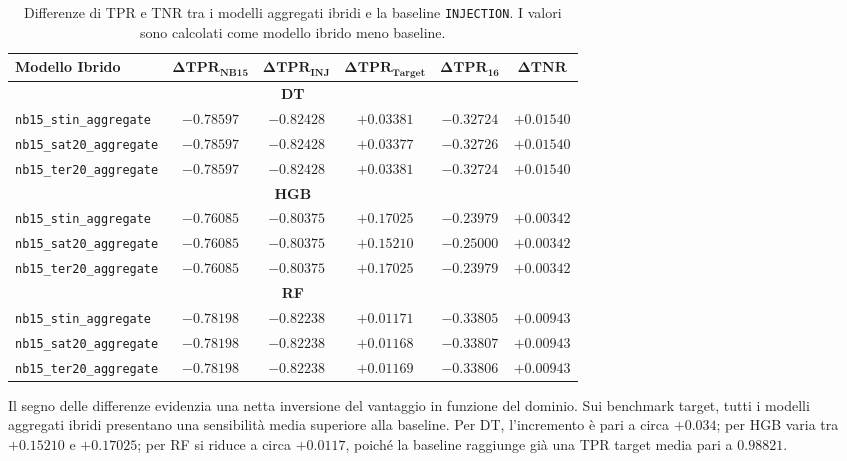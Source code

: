 \begin{table}[H]
    \centering
    \small
    \caption{Differenze di TPR e TNR tra i modelli aggregati ibridi e la baseline \texttt{INJECTION}. I valori sono calcolati come modello ibrido meno baseline.}
    \label{tab:hybrid_vs_base_aggregate_delta}
    \begin{tabular}{lccccc}
        \toprule
        \textbf{Modello Ibrido} & $\boldsymbol{\Delta TPR_{\text{NB15}}}$ & $\boldsymbol{\Delta TPR_{\text{INJ}}}$ & $\boldsymbol{\Delta TPR_{\text{Target}}}$ & $\boldsymbol{\Delta TPR_{16}}$ & $\boldsymbol{\Delta TNR}$ \\
        \midrule
        \multicolumn{6}{c}{\textbf{DT}} \\
        \hline
        \texttt{nb15\_stin\_aggregate} & $-0.78597$ & $-0.82428$ & $+0.03381$ & $-0.32724$ & $+0.01540$ \\
        \texttt{nb15\_sat20\_aggregate} & $-0.78597$ & $-0.82428$ & $+0.03377$ & $-0.32726$ & $+0.01540$ \\
        \texttt{nb15\_ter20\_aggregate} & $-0.78597$ & $-0.82428$ & $+0.03381$ & $-0.32724$ & $+0.01540$ \\
        \hline
        \multicolumn{6}{c}{\textbf{HGB}} \\
        \hline
        \texttt{nb15\_stin\_aggregate} & $-0.76085$ & $-0.80375$ & $+0.17025$ & $-0.23979$ & $+0.00342$ \\
        \texttt{nb15\_sat20\_aggregate} & $-0.76085$ & $-0.80375$ & $+0.15210$ & $-0.25000$ & $+0.00342$ \\
        \texttt{nb15\_ter20\_aggregate} & $-0.76085$ & $-0.80375$ & $+0.17025$ & $-0.23979$ & $+0.00342$ \\
        \hline
        \multicolumn{6}{c}{\textbf{RF}} \\
        \hline
        \texttt{nb15\_stin\_aggregate} & $-0.78198$ & $-0.82238$ & $+0.01171$ & $-0.33805$ & $+0.00943$ \\
        \texttt{nb15\_sat20\_aggregate} & $-0.78198$ & $-0.82238$ & $+0.01168$ & $-0.33807$ & $+0.00943$ \\
        \texttt{nb15\_ter20\_aggregate} & $-0.78198$ & $-0.82238$ & $+0.01169$ & $-0.33806$ & $+0.00943$ \\
        \bottomrule
    \end{tabular}
\end{table}

Il segno delle differenze evidenzia una netta inversione del vantaggio in funzione del dominio. 
Sui benchmark target, tutti i modelli aggregati ibridi presentano una sensibilità media superiore alla baseline. 
Per DT, l'incremento è pari a circa $+0.034$; per HGB varia tra $+0.15210$ e $+0.17025$; per RF si riduce a circa $+0.0117$, poiché la baseline raggiunge già una TPR target media pari a $0.98821$.

